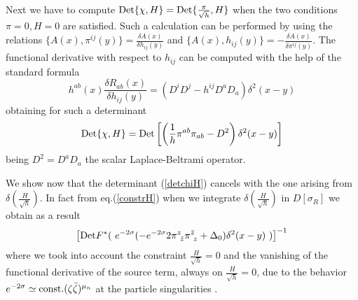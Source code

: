 \documentclass[a4paper,12pt]{article}
\begin{document}
Next we have to compute ${\rm Det}\{\chi,H\}={\rm
Det}\{\frac{\pi}{\sqrt h},H\}$ when the two conditions $\pi=0, H=0$
are satisfied. Such a calculation can be performed by using the
relations $\{A(x),\pi^{ij}(y)\}=\frac{\delta A(x)}{\delta h_{ij}(y)}$
and $\{A(x),h_{ij}(y)\}=-\frac{\delta A(x)}{\delta \pi^{ij}(y)}$. The
functional derivative with respect to $h_{ij}$ can be computed with
the help of the standard formula \cite{wald}
\begin{equation}
h^{ab}(x)\frac{\delta R_{ab}(x)}{\delta h_{ij}(y)}=
(D^iD^j-h^{ij}D^aD_a)\delta^2(x-y)
\end{equation}
obtaining for such a determinant 
\begin{equation}\label{detchiH}
{\rm Det}\{\chi,H\}={\rm
Det}\left[\left(\frac{1}{h}\pi^{ab}\pi_{ab}-D^2\right)\delta^2(x-y)\right]
\end{equation}
being $D^2=D^aD_a$ the scalar Laplace-Beltrami operator.

We show now that the determinant (\ref{detchiH}) cancels with the one
arising from $\delta(\frac{H}{\sqrt h})$. In fact from
eq.(\ref{constrH}) when we integrate $\delta(\frac{H}{\sqrt h})$ in
$D[\sigma_R]$ we obtain as a result
\begin{equation}
\left[{\rm Det}F^*(~e^{-2\sigma}(-e^{-2\sigma}2\pi^z_{~\bar z}\pi^{\bar
z}_{~z}+\Delta_0)\delta^2(x-y)~)\right]^{-1}
\end{equation}
where we took into account the constraint $\frac{H}{\sqrt h}=0$ and
the vanishing of the functional derivative of the source term, always
on $\frac{H}{\sqrt h}=0$, due to the behavior $e^{-2\sigma}\simeq{\rm
const.}(\zeta \bar{\zeta})^{\mu_n}$ at the particle singularities \cite{MS}. 
\end{document}
